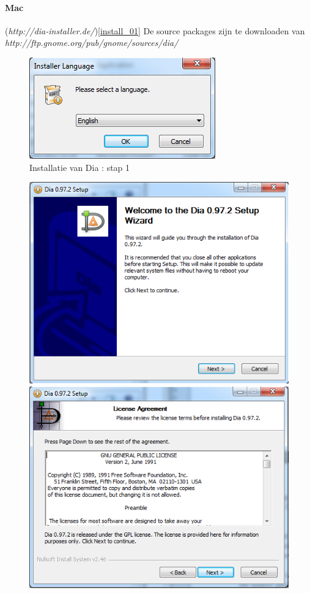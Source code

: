 \documentclass[12pt,a4paper]{report}
\begin{document}
\begin{flushleft}
\paragraph*{Mac}
(\textit{http://dia-installer.de/})\ref{install_01}\linebreak
De source packages zijn te downloaden van \textit{http://ftp.gnome.org/pub/gnome/sources/dia/}
\begin{figure}[H]
\includegraphics[scale=0.75]{images/install_02.png}
\centering
\vspace{-10pt}
\caption{Installatie van Dia : stap 1}
\label{install_02}
\end{figure}
\begin{figure}[H]
\includegraphics[scale=0.5]{images/install_03.png}
\label{install_03}
\includegraphics[scale=0.5]{images/install_04.png}

\end{figure}
\end{flushleft}
\end{document}
